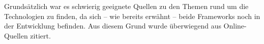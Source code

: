 
	
	
	
	
	




Grunds\"atzlich war es schwierig geeignete Quellen zu den Themen rund um die Technologien zu finden, da sich -- wie bereits erw\"ahnt -- beide Frameworks noch in der Entwicklung befinden. Aus diesem Grund wurde \"uberwiegend aus Online-Quellen zitiert.

